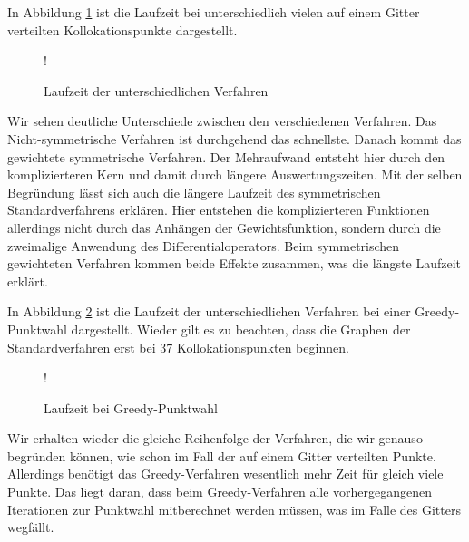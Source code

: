 In Abbildung \ref{fig:Laufzeit} ist die Laufzeit bei unterschiedlich vielen auf einem Gitter verteilten Kollokationspunkte dargestellt.
\begin{figure}[ht]
\centering
\resizebox {\columnwidth} {!} {

}
\caption{Laufzeit der unterschiedlichen Verfahren}
\label{fig:Laufzeit}
\end{figure}

Wir sehen deutliche Unterschiede zwischen den verschiedenen Verfahren. Das Nicht-symmetrische Verfahren ist durchgehend das schnellste. Danach kommt das gewichtete symmetrische Verfahren. Der Mehraufwand entsteht hier durch den komplizierteren Kern und damit durch längere Auswertungszeiten. Mit der selben Begründung lässt sich auch die längere Laufzeit des symmetrischen Standardverfahrens erklären. Hier entstehen die komplizierteren Funktionen allerdings nicht durch das Anhängen der Gewichtsfunktion, sondern durch die zweimalige Anwendung des Differentialoperators. Beim symmetrischen gewichteten Verfahren kommen beide Effekte zusammen, was die längste Laufzeit erklärt.

In Abbildung \ref{fig:Laufzeit-greedy} ist die Laufzeit der unterschiedlichen Verfahren bei einer Greedy-Punktwahl dargestellt. Wieder gilt es zu beachten, dass die Graphen der Standardverfahren erst bei $37$ Kollokationspunkten beginnen.
\begin{figure}[ht]
\centering
\resizebox {\columnwidth} {!} {

}
\caption{Laufzeit bei Greedy-Punktwahl}
\label{fig:Laufzeit-greedy}
\end{figure}

Wir erhalten wieder die gleiche Reihenfolge der Verfahren, die wir genauso begründen können, wie schon im Fall der auf einem Gitter verteilten Punkte. Allerdings benötigt das Greedy-Verfahren wesentlich mehr Zeit für gleich viele Punkte. Das liegt daran, dass beim Greedy-Verfahren alle vorhergegangenen Iterationen zur Punktwahl mitberechnet werden müssen, was im Falle des Gitters wegfällt.